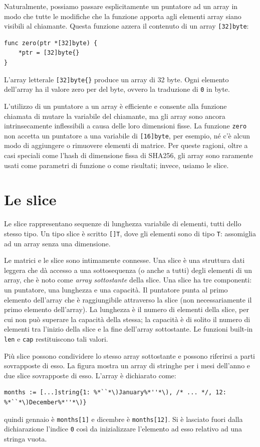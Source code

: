 Naturalmente, possiamo passare esplicitamente un puntatore ad un array in modo che tutte le modifiche che la funzione apporta agli elementi array siano visibili al chiamante.
Questa funzione azzera il contenuto di un array \verb|[32]byte|:
\begin{lstlisting}[frame=single, label={lst:lstlisting3-1.11}]
func zero(ptr *[32]byte) {
    *ptr = [32]byte{}
}
\end{lstlisting}
L'array letterale \verb|[32]byte{}| produce un array di 32 byte.
Ogni elemento dell'array ha il valore zero per del byte, ovvero la traduzione di \verb|0| in byte.

L'utilizzo di un puntatore a un array è efficiente e consente alla funzione chiamata di mutare la variabile del chiamante, ma gli array sono ancora intrinsecamente inflessibili a causa delle loro dimensioni fisse.
La funzione \verb|zero| non accetta un puntatore a una variabile di \verb|[16]byte|, per esempio, né c'è alcun modo di aggiungere o rimuovere elementi di matrice.
Per queste ragioni, oltre a casi speciali come l'hash di dimensione fissa di SHA256, gli array sono raramente usati come parametri di funzione o come risultati;
invece, usiamo le slice.


\section{Le slice}
\label{sec:le_slice}%
Le slice rappresentano sequenze di lunghezza variabile di elementi, tutti dello stesso tipo.
Un tipo slice è scritto \verb|[]T|, dove gli elementi sono di tipo \verb|T|: assomiglia ad un array senza una dimensione.

Le matrici e le slice sono intimamente connesse.
Una slice è una struttura dati leggera che dà accesso a una sottosequenza (o anche a tutti) degli elementi di un array, che è noto come \textit{array sottostante} della slice.
Una slice ha tre componenti: un puntatore, una lunghezza e una capacità.
Il puntatore punta al primo elemento dell'array che è raggiungibile attraverso la slice (non necessariamente il primo elemento dell'array).
La lunghezza è il numero di elementi della slice, per cui non può superare la capacità della stessa;
la capacità è di solito il numero di elementi tra l'inizio della slice e la fine dell'array sottostante.
Le funzioni built-in \verb|len| e \verb|cap| restituiscono tali valori.

Più slice possono condividere lo stesso array sottostante e possono riferirsi a parti sovrapposte di esso.
La figura mostra un array di stringhe per i mesi dell'anno e due slice sovrapposte di esso.
L'array è dichiarato come:
\begin{lstlisting}[label={lst:lstlisting3-2.1}]
months := [...]string{1: %*``*\)January%*''*\), /* ... */, 12: %*``*\)December%*''*\)}
\end{lstlisting}
quindi gennaio è \verb|months[1]| e dicembre è \verb|months[12]|.
Si è lasciato fuori dalla dichiarazione l'indice \verb|0| così da inizializzare l'elemento ad esso relativo ad una stringa vuota.


